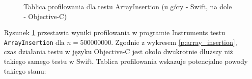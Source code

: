 \documentclass[mgr, shortabstract]{iithesis}
\begin{document}
\begin{figure}
    \caption{Tablica profilowania dla testu ArrayInsertion (u góry - Swift, na dole - Objective-C)}
    \label{i:array_insertion}
\end{figure}

Rysunek \ref{i:array_insertion} przestawia wyniki profilowania w programie Instruments testu \texttt{ArrayInsertion} dla $n = 500000000$. Zgodnie z wykresem \ref{p:array_insertion}, czas działania testu w języku Objective-C jest około dwukrotnie dłuższy niż takiego samego testu w Swift. Tablica profilowania wskazuje potencjalne powody takiego stanu:
\end{document}

